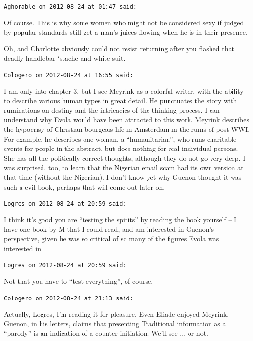 \begin{footnotesize}
\begin{sffamily}
\texttt{Aghorable on 2012-08-24 at 01:47 said:}

Of course. This is why some women who might not be considered sexy if judged by popular standards still get a man's juices flowing when he is in their presence.

Oh, and Charlotte obviously could not resist returning after you flashed that deadly handlebar `stache and white suit.

\hfill

\texttt{Cologero on 2012-08-24 at 16:55 said:}

I am only into chapter 3, but I see Meyrink as a colorful writer, with the ability to describe various human types in great detail. He punctuates the story with ruminations on destiny and the intricacies of the thinking process. I can understand why Evola would have been attracted to this work. Meyrink describes the hypocrisy of Christian bourgeois life in Amsterdam in the ruins of post-WWI. For example, he describes one woman, a ``humanitarian'', who runs charitable events for people in the abstract, but does nothing for real individual persons. She has all the politically correct thoughts, although they do not go very deep. I was surprised, too, to learn that the Nigerian email scam had its own version at that time (without the Nigerian). I don't know yet why Guenon thought it was such a evil book, perhaps that will come out later on.

\hfill

\texttt{Logres on 2012-08-24 at 20:59 said:}

I think it's good you are ``testing the spirits'' by reading the book yourself -- I have one book by M that I could read, and am interested in Guenon's perspective, given he was so critical of so many of the figures Evola was interested in.

\hfill

\texttt{Logres on 2012-08-24 at 20:59 said:}

Not that you have to ``test everything'', of course.

\hfill

\texttt{Cologero on 2012-08-24 at 21:13 said:}

Actually, Logres, I'm reading it for pleasure. Even Eliade enjoyed Meyrink. Guenon, in his letters, claims that presenting Traditional information as a ``parody'' is an indication of a counter-initiation. We'll see ... or not.


\end{sffamily}
\end{footnotesize}
